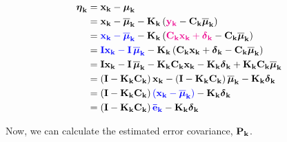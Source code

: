 \documentclass[12pt]{article}
\begin{document}
\begin{equation}
    \begin{aligned}
       \mb{\eta}_\mathbf{k} &= \bvec{x_k} - \mb{\mu}_\mathbf{k} \\
       &= \bvec{x_k} - \mb{\overline{\mu}}_\mathbf{k} - \mat{K_k}\parentheses{\magenta{\bvec{y_k}} - \mat{C_k}\mb{\overline{\mu}}_\mathbf{k}}\\
       &= \blue{\bvec{x_k} - \mb{\overline{\mu}}_\mathbf{k}} - \mat{K_k}\parentheses{\magenta{\mat{C_k}\bvec{x_k} + \mb{\delta}_\mathbf{k}} - \mat{C_k}\mb{\overline{\mu}}_\mathbf{k}}\\
       &= \blue{\mat{I}\bvec{x_k} - \mat{I}\,\mb{\overline{\mu}}_\mathbf{k}} - \mat{K_k}\parentheses{\mat{C_k}\bvec{x_k} + \mb{\delta}_\mathbf{k} - \mat{C_k}\mb{\overline{\mu}}_\mathbf{k}}\\
       &= \mat{I}\bvec{x_k} - \mat{I}\,\mb{\overline{\mu}}_\mathbf{k} - \mat{K_k}\mat{C_k}\bvec{x_k} - \mat{K_k}\mb{\delta}_\mathbf{k} + \mat{K_k}\mat{C_k}\mb{\overline{\mu}}_\mathbf{k}\\
       &= \parentheses{\mat{I} - \mat{K_k}\mat{C_k}}\bvec{x_k} - \parentheses{\mat{I} - \mat{K_k}\mat{C_k}}\mb{\overline{\mu}}_\mathbf{k} - \mat{K_k}\mb{\delta}_\mathbf{k}\\
       &= \parentheses{\mat{I} - \mat{K_k}\mat{C_k}} \blue{\parentheses{\bvec{x_k} - \mb{\overline{\mu}}_\mathbf{k}}} - \mat{K_k}\mb{\delta}_\mathbf{k}\\
       &= \parentheses{\mat{I} - \mat{K_k}\mat{C_k}} \blue{\bvec{\bar{e}_k}} - \mat{K_k}\mb{\delta}_\mathbf{k}\\
    \end{aligned}
    \label{eq:estimated-error}
\end{equation}

Now, we can calculate the estimated error covariance, $\boldsymbol{\mathbf{P_k}}$.
\end{document}
